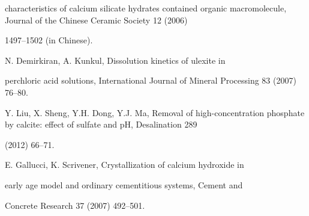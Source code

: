 \documentclass[a4paper,portrait,12pt]{article}
\begin{document}
\begin{flushleft}
characteristics of calcium silicate hydrates contained organic macromolecule, Journal of the Chinese Ceramic Society 12 (2006)
\end{flushleft}


\begin{flushleft}
1497--1502 (in Chinese).
\end{flushleft}


\begin{flushleft}
[25] N. Demirkiran, A. Kunkul, Dissolution kinetics of ulexite in
\end{flushleft}


\begin{flushleft}
perchloric acid solutions, International Journal of Mineral Processing 83 (2007) 76--80.
\end{flushleft}


\begin{flushleft}
[26] Y. Liu, X. Sheng, Y.H. Dong, Y.J. Ma, Removal of high-concentration phosphate by calcite: effect of sulfate and pH, Desalination 289
\end{flushleft}


(2012) 66--71.


\begin{flushleft}
[27] E. Gallucci, K. Scrivener, Crystallization of calcium hydroxide in
\end{flushleft}


\begin{flushleft}
early age model and ordinary cementitious systems, Cement and
\end{flushleft}


\begin{flushleft}
Concrete Research 37 (2007) 492--501.
\end{flushleft}





\newpage
\end{document}
